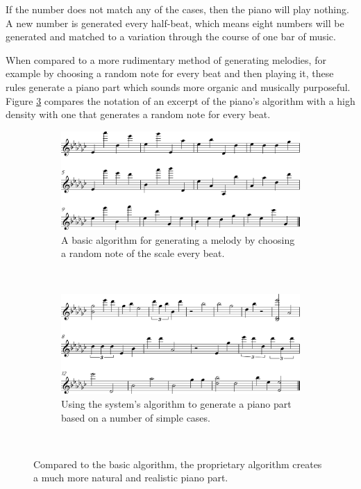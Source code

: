 If the number does not match any of the cases, then the piano will play nothing. A new number is generated every half-beat, which means eight numbers will be generated and matched to a variation through the course of one bar of music.

When compared to a more rudimentary method of generating melodies, for example by choosing a random note for every beat and then playing it, these rules generate a piano part which sounds more organic and musically purposeful. Figure \ref{fig:piano} compares the notation of an excerpt of the piano’s algorithm with a high density with one that generates a random note for every beat.

\begin{figure}[htb] 
    \centering
    \begin{subfigure}[b]{0.45\textwidth}
        \includegraphics[width=\textwidth]{images/implementation/generated-piano-basic.png}
        \caption{A basic algorithm for generating a melody by choosing a random note of the scale every beat.}
        \label{fig:generated-piano-basic}
    \end{subfigure}
    ~
    \begin{subfigure}[b]{0.45\textwidth}
        \includegraphics[width=\textwidth]{images/implementation/generated-piano.png}
        \caption{Using the system's algorithm to generate a piano part based on a number of simple cases.}
        \label{fig:generated-piano}
    \end{subfigure}
    ~
    \caption{
    Compared to the  basic algorithm, the  proprietary algorithm creates a much more natural and realistic piano part.
    }\label{fig:piano}
\end{figure}


